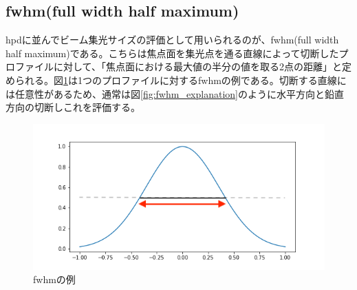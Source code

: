 \documentclass[dvipdfmx,autodetect-engine]{jreport}
\begin{document}
\subsection{fwhm(full width half maximum)}
hpdに並んでビーム集光サイズの評価として用いられるのが、fwhm(full width half maximum)である。こちらは焦点面を集光点を通る直線によって切断したプロファイルに対して、「焦点面における最大値の半分の値を取る2点の距離」と定められる。図\ref{fig:fwhm_explanation_profile}は1つのプロファイルに対するfwhmの例である。切断する直線には任意性があるため、通常は図\ref{fig:fwhm_explanation}のように水平方向と鉛直方向の切断しこれを評価する。

\begin{figure}[h!]
\centering
\includegraphics[scale=0.6]{images/error_simulation/explanation/fwhm.png}
\caption{fwhmの例}
\label{fig:fwhm_explanation_profile}
\end{figure}
\end{document}

